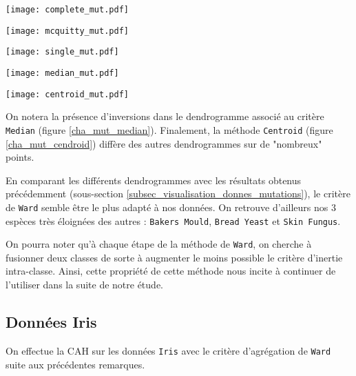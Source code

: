 \documentclass{article}
\begin{document}
\begin{multicols}{2}
\begingroup
   \centering
   \texttt{[image: complete\_mut.pdf]}
    \label{cha_mut_complete}
\endgroup

\begingroup
   \centering
   \texttt{[image: mcquitty\_mut.pdf]}
    \label{cha_mut_mcquitty}
\endgroup

\begingroup
   \centering
   \texttt{[image: single\_mut.pdf]}
    \label{cha_mut_single}
\endgroup

\begingroup
   \centering
   \texttt{[image: median\_mut.pdf]}
    \label{cha_mut_median}
\endgroup

\begingroup
   \centering
   \texttt{[image: centroid\_mut.pdf]}
    \label{cha_mut_cendroid}
\endgroup

On notera la présence d'inversions dans le dendrogramme associé au critère \texttt{Median} (figure \ref{cha_mut_median}). Finalement, la méthode \texttt{Centroid} (figure \ref{cha_mut_cendroid}) diffère des autres dendrogrammes sur de "nombreux" points.

En comparant les différents dendrogrammes avec les résultats obtenus précédemment (sous-section \ref{subsec_visualisation_donnes_mutations}), le critère de \texttt{Ward} semble être le plus adapté à nos données. On retrouve d'ailleurs nos $3$ espèces très éloignées des autres : \texttt{Bakers Mould}, \texttt{Bread Yeast} et \texttt{Skin Fungus}.

On pourra noter qu'à chaque étape de la méthode de \texttt{Ward}, on cherche à fusionner deux classes de sorte à augmenter le moins possible le critère d'inertie intra-classe. Ainsi, cette propriété de cette méthode nous incite à continuer de l'utiliser dans la suite de notre étude.

\subsection{Données Iris}

On effectue la CAH sur les données \texttt{Iris} avec le critère d'agrégation de \texttt{Ward} suite aux précédentes remarques.


\end{multicols}
\end{document}

